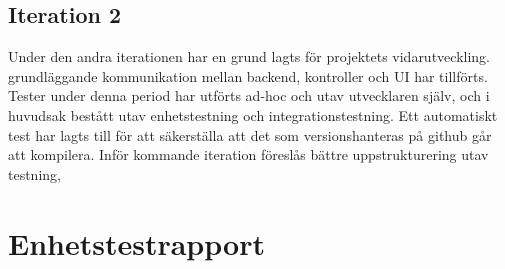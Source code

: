 \documentclass[10pt]{article}
\begin{document}
\subsection{Iteration 2}
Under den andra iterationen har en grund lagts för projektets vidarutveckling. grundläggande kommunikation mellan backend, kontroller och UI har tillförts. Tester under denna period har utförts ad-hoc och utav utvecklaren själv, och i huvudsak bestått utav enhetstestning och integrationstestning. Ett automatiskt test har lagts till för att säkerställa att det som versionshanteras på github går att kompilera. Inför kommande iteration föreslås bättre uppstrukturering utav testning,

\section{Enhetstestrapport}
\end{document}
